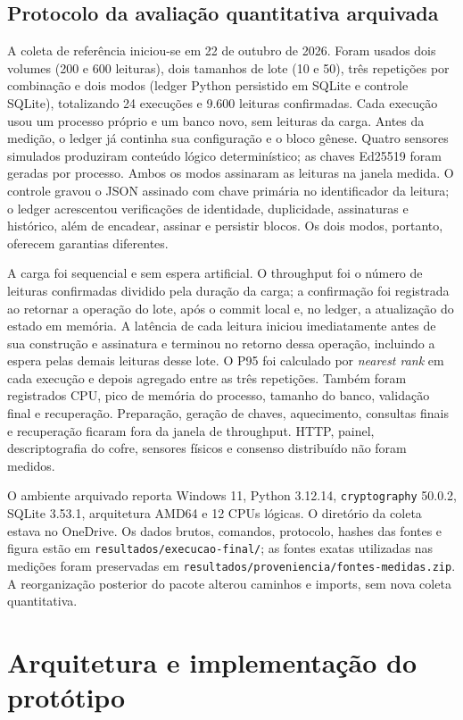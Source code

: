 \documentclass[10pt,a4paper,twocolumn]{article}
\begin{document}
\subsection{Protocolo da avaliação quantitativa arquivada}
A coleta de referência iniciou-se em 22 de outubro de 2026. Foram usados dois volumes (200 e 600 leituras), dois tamanhos de lote (10 e 50), três repetições por combinação e dois modos (ledger Python persistido em SQLite e controle SQLite), totalizando 24 execuções e 9.600 leituras confirmadas. Cada execução usou um processo próprio e um banco novo, sem leituras da carga. Antes da medição, o ledger já continha sua configuração e o bloco gênese. Quatro sensores simulados produziram conteúdo lógico determinístico; as chaves Ed25519 foram geradas por processo. Ambos os modos assinaram as leituras na janela medida. O controle gravou o JSON assinado com chave primária no identificador da leitura; o ledger acrescentou verificações de identidade, duplicidade, assinaturas e histórico, além de encadear, assinar e persistir blocos. Os dois modos, portanto, oferecem garantias diferentes.

A carga foi sequencial e sem espera artificial. O throughput foi o número de leituras confirmadas dividido pela duração da carga; a confirmação foi registrada ao retornar a operação do lote, após o commit local e, no ledger, a atualização do estado em memória. A latência de cada leitura iniciou imediatamente antes de sua construção e assinatura e terminou no retorno dessa operação, incluindo a espera pelas demais leituras desse lote. O P95 foi calculado por \textit{nearest rank} em cada execução e depois agregado entre as três repetições. Também foram registrados CPU, pico de memória do processo, tamanho do banco, validação final e recuperação. Preparação, geração de chaves, aquecimento, consultas finais e recuperação ficaram fora da janela de throughput. HTTP, painel, descriptografia do cofre, sensores físicos e consenso distribuído não foram medidos.

O ambiente arquivado reporta Windows 11, Python 3.12.14, \texttt{cryptography} 50.0.2, SQLite 3.53.1, arquitetura AMD64 e 12 CPUs lógicas. O diretório da coleta estava no OneDrive. Os dados brutos, comandos, protocolo, hashes das fontes e figura estão em \texttt{resultados/execucao-final/}; as fontes exatas utilizadas nas medições foram preservadas em \texttt{resultados/proveniencia/fontes-medidas.zip}. A reorganização posterior do pacote alterou caminhos e imports, sem nova coleta quantitativa.

\section{Arquitetura e implementação do protótipo}
\end{document}
